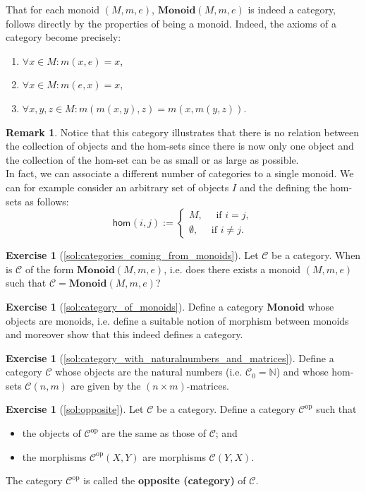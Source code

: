 \documentclass[a4paper,10pt]{scrartcl}
\theoremstyle{plain}
\theoremstyle{definition}
\newtheorem{rem}[thm]{Remark}
\newtheorem{exer}[thm]{Exercise}
\newcommand{\cfont}[1]{\ensuremath{\mathsf{#1}}}
\newcommand{\Cat}[1]{\mathcal{#1}}
\newcommand{\CC}{\Cat{C}}
\newcommand{\Catb}[1]{\mathbf{#1}}
\newcommand{\MON}{\Catb{Monoid}}
\newcommand{\Ob}[1]{{#1}_0}
\newcommand{\Hom}[3][]{\cfont{hom}_{#1}(#2,#3)}
\newcommand{\CHom}[3]{{#1}(#2,#3)}
\newcommand{\op}[1]{\ensuremath{{#1}^\text{op}}}
\begin{document}
That for each monoid $(M,m,e)$, $\MON(M,m,e)$ is indeed a category, follows directly by the properties of being a monoid. Indeed, the axioms of a category become precisely:
\begin{enumerate}
\item $\forall x\in M: m(x,e)=x$,
\item $\forall x\in M: m(e,x)=x$,
\item $\forall x,y,z\in M: m(m(x,y),z) = m(x,m(y,z))$.
\end{enumerate}

\begin{rem} Notice that this category illustrates that there is no relation between the collection of objects and the hom-sets since there is now only one object and the collection of the hom-set can be as small or as large as possible.\\
In fact, we can associate a different number of categories to a single monoid. We can for example consider an arbitrary set of objects $I$ and the defining the hom-sets as follows:
\[
\Hom{i}{j} := 
\begin{cases}
M ,\quad \text{ if } i=j,\\
\emptyset, \quad \text{ if } i\not=j.
\end{cases}
\]
\end{rem}

\begin{exer}[\cref{sol:categories_coming_from_monoids}]\label{exer:categories_coming_from_monoids}
  Let $\CC$ be a category. When is $\CC$ of the form $\MON(M,m,e)$, i.e. does there exists a monoid $(M,m,e)$ such that $\CC =  \MON(M,m,e)$?
\end{exer}

\begin{exer}[\cref{sol:category_of_monoids}]\label{exer:category_of_monoids}
  Define a category $\MON$ whose objects are monoids, i.e. define a suitable notion of morphism between monoids and moreover show that this indeed defines a category.
\end{exer}

\begin{exer}[\cref{sol:category_with_naturalnumbers_and_matrices}]\label{exer:category_with_naturalnumbers_and_matrices}
  Define a category $\CC$ whose objects are the natural numbers (i.e. $\Ob{\CC} = \mathbb{N}$) and whose hom-sets $\CHom{\CC}{n}{m}$ are given by the $(n\times m)$-matrices.
\end{exer}

\begin{exer}[\cref{sol:opposite}]\label{exer:opposite}
  Let $\CC$ be a category. Define a category $\op\CC$ such that
  \begin{itemize}
  \item the objects of $\op\CC$ are the same as those of $\CC$; and
  \item the morphisms $\CHom {\op\CC} X Y$ are morphisms $\CHom \CC Y X$.
  \end{itemize}
  The category $\op\CC$ is called the \textbf{opposite (category)} of $\CC$.
\end{exer}
\end{document}
